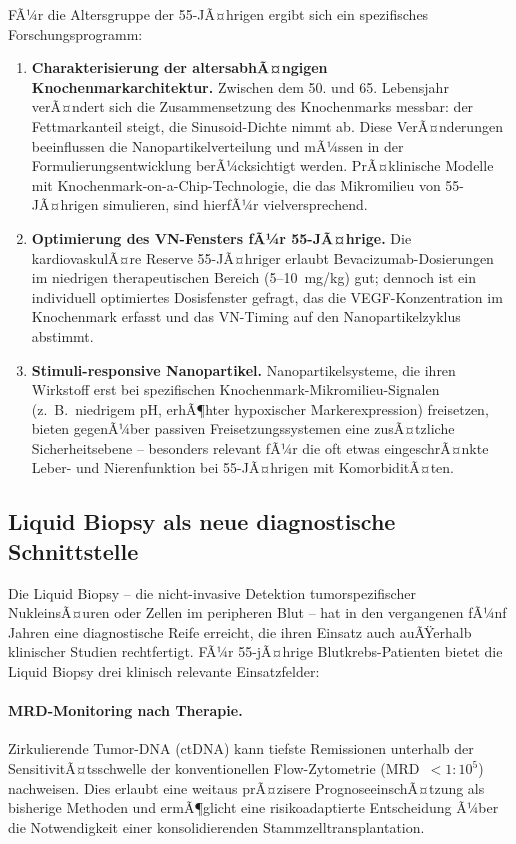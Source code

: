 ﻿\documentclass[12pt,a4paper]{article}
\theoremstyle{definition}
\begin{document}
FÃ¼r die Altersgruppe der 55-JÃ¤hrigen ergibt sich ein spezifisches Forschungsprogramm:
\begin{enumerate}
  \item \textbf{Charakterisierung der altersabhÃ¤ngigen Knochenmarkarchitektur.}
        Zwischen dem 50. und 65. Lebensjahr verÃ¤ndert sich die Zusammensetzung des
        Knochenmarks messbar: der Fettmarkanteil steigt, die Sinusoid-Dichte nimmt ab.
        Diese VerÃ¤nderungen beeinflussen die Nanopartikelverteilung und mÃ¼ssen in der
        Formulierungsentwicklung berÃ¼cksichtigt werden. PrÃ¤klinische Modelle mit
        Knochenmark-on-a-Chip-Technologie, die das Mikromilieu von 55-JÃ¤hrigen simulieren,
        sind hierfÃ¼r vielversprechend.
  \item \textbf{Optimierung des VN-Fensters fÃ¼r 55-JÃ¤hrige.}
        Die kardiovaskulÃ¤re Reserve 55-JÃ¤hriger erlaubt Bevacizumab-Dosierungen im
        niedrigen therapeutischen Bereich (5--10~mg/kg) gut; dennoch ist ein individuell
        optimiertes Dosisfenster gefragt, das die VEGF-Konzentration im Knochenmark
        erfasst und das VN-Timing auf den Nanopartikelzyklus abstimmt.
  \item \textbf{Stimuli-responsive Nanopartikel.}
        Nanopartikelsysteme, die ihren Wirkstoff erst bei spezifischen Knochenmark-Mikromilieu-Signalen
        (z.~B.\ niedrigem pH, erhÃ¶hter hypoxischer Markerexpression) freisetzen,
        bieten gegenÃ¼ber passiven Freisetzungssystemen eine zusÃ¤tzliche Sicherheitsebene
        -- besonders relevant fÃ¼r die oft etwas eingeschrÃ¤nkte Leber- und Nierenfunktion
        bei 55-JÃ¤hrigen mit KomorbiditÃ¤ten.
\end{enumerate}

\subsection{Liquid Biopsy als neue diagnostische Schnittstelle}

Die Liquid Biopsy -- die nicht-invasive Detektion tumorspezifischer NukleinsÃ¤uren oder
Zellen im peripheren Blut -- hat in den vergangenen fÃ¼nf Jahren eine diagnostische
Reife erreicht, die ihren Einsatz auch auÃŸerhalb klinischer Studien rechtfertigt.
FÃ¼r 55-jÃ¤hrige Blutkrebs-Patienten bietet die Liquid Biopsy drei klinisch relevante
Einsatzfelder:

\paragraph{MRD-Monitoring nach Therapie.}
Zirkulierende Tumor-DNA (ctDNA) kann tiefste Remissionen unterhalb der
SensitivitÃ¤tsschwelle der konventionellen Flow-Zytometrie (MRD~$<1{:}10^5$)
nachweisen. Dies erlaubt eine weitaus prÃ¤zisere Prognoseeinsch\-Ã¤tzung als bisherige
Methoden und ermÃ¶glicht eine risikoadaptierte Entscheidung Ã¼ber die Notwendigkeit
einer konsolidierenden Stammzelltransplantation.
\end{document}
